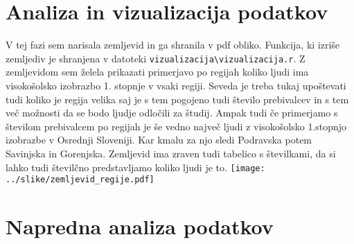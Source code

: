 \documentclass[11pt,a4paper]{article}
\begin{document}
\section{Analiza in vizualizacija podatkov}
V tej fazi sem narisala zemljevid in ga shranila v pdf obliko. Funkcija, ki izriše zemljediv je shranjena v datoteki \verb|vizualizacija\vizualizacija.r|. Z zemljevidom sem želela prikazati primerjavo po regijah koliko ljudi ima visokošolsko izobrazbo 1. stopnje v vsaki regiji. Seveda je treba tukaj upoštevati tudi koliko je regija velika saj je s tem pogojeno tudi število prebivalcev in s tem več možnosti da se bodo ljudje odločili za študij. Ampak tudi če primerjamo s številom prebivalcem po regijah je še vedno največ ljudi z visokošolsko 1.stopnjo izobrazbe v Osrednji Sloveniji. Kar kmalu za njo sledi Podravska potem Savinjska in Gorenjska. Zemljevid ima zraven tudi tabelico s številkami, da si lahko tudi številčno predstavljamo koliko ljudi je to.
\texttt{[image: ../slike/zemljevid\_regije.pdf]}

\section{Napredna analiza podatkov}

\end{document}
